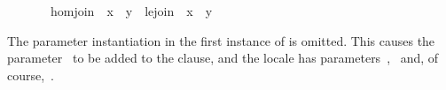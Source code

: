 \begin{isabellebody}
\ \ \ \ \ \ \ hom{}join{}\ {}{}\ {}x\ {}\ y{}\ {}\ le{}{}join\ {}{}\ x{}\ {}{}\ y{}{}%
\begin{isamarkuptext}%
The parameter instantiation in the first instance of  is omitted.  This causes the parameter~ to be
  added to the  clause, and the locale has
  parameters~,~ and, of course,~.


\end{isamarkuptext}
\end{isabellebody}
